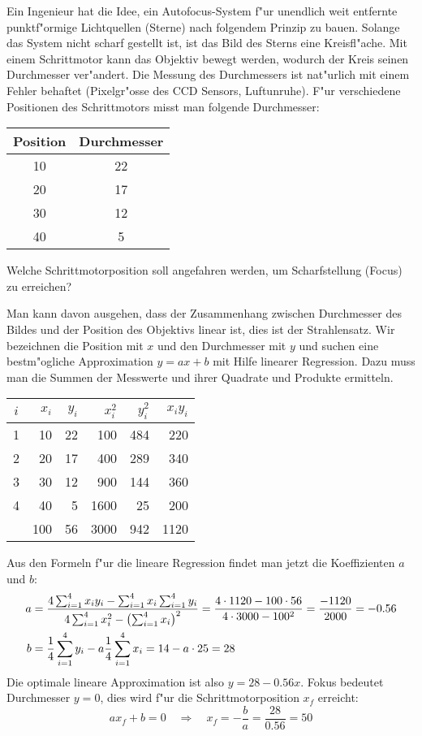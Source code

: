 Ein Ingenieur hat die Idee, ein Autofocus-System f"ur unendlich weit
entfernte punktf"ormige
Lichtquellen (Sterne) nach folgendem Prinzip zu bauen.
Solange das System nicht scharf gestellt ist,
ist das Bild des Sterns eine Kreisfl"ache.
Mit einem Schrittmotor kann das Objektiv bewegt werden, wodurch der Kreis
seinen Durchmesser ver"andert. Die Messung des Durchmessers ist 
nat"urlich mit einem Fehler behaftet (Pixelgr"osse des CCD Sensors,
Luftunruhe).
F"ur verschiedene Positionen des Schrittmotors misst man folgende
Durchmesser:
\begin{center}
\begin{tabular}{|c|c|}
\hline
Position&Durchmesser\\
\hline
10&22\\
20&17\\
30&12\\
40&5\\
\hline
\end{tabular}
\end{center}
Welche Schrittmotorposition soll angefahren werden, um Scharfstellung
(Focus) zu erreichen?

\begin{loesung}
Man kann davon ausgehen, dass der Zusammenhang zwischen Durchmesser
des Bildes und der Position des Objektivs linear ist, dies ist der
Strahlensatz. Wir bezeichnen die Position mit $x$ und den Durchmesser
mit $y$ und suchen eine bestm"ogliche Approximation $y=ax+b$ mit
Hilfe linearer Regression. Dazu muss man die Summen der Messwerte und
ihrer Quadrate und Produkte ermitteln.
\begin{center}
\begin{tabular}{|c|rr|rrr|}
\hline
$i$&$x_i$&$y_i$&$x_i^2$&$y_i^2$&$x_iy_i$\\
\hline
1& 10&22& 100&484& 220\\
2& 20&17& 400&289& 340\\
3& 30&12& 900&144& 360\\
4& 40& 5&1600& 25& 200\\
\hline
 &100&56&3000&942&1120\\
\hline
\end{tabular}
\end{center}
Aus den Formeln f"ur die lineare Regression findet man jetzt die
Koeffizienten $a$ und $b$:
\begin{align*}
a&=\frac{
4\sum_{i=1}^4 x_iy_i-\sum_{i=1}^4x_i\sum_{i=1}^4y_i
}{
4\sum_{i=1}^4x_i^2-\bigl(\sum_{i=1}^4 x_i\bigr)^2
}
=
\frac{4\cdot 1120-100\cdot 56}{4\cdot 3000-100^2}=\frac{-1120}{2000}=-0.56
\\
b&=\frac14\sum_{i=1}^4y_i-a\frac14\sum_{i=1}^4x_i
=14 - a\cdot 25=28
\end{align*}
Die optimale lineare Approximation ist also $y=28-0.56x$.
Fokus bedeutet Durchmesser $y=0$, dies wird f"ur die Schrittmotorposition
$x_f$ erreicht:
\[
ax_f+b=0\quad\Rightarrow\quad x_f=-\frac{b}{a}=\frac{28}{0.56}=50
\]
\end{loesung}
